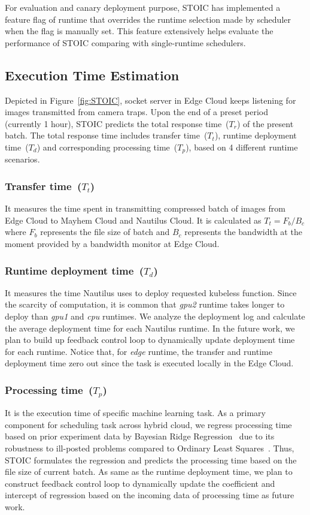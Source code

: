  For evaluation and canary deployment purpose, STOIC has implemented a feature flag of runtime that overrides the runtime selection made by scheduler when the flag is manually set. This feature extensively helps evaluate the performance of STOIC comparing with single-runtime schedulers.
 
 
 \subsection{Execution Time Estimation}
 Depicted in Figure~\ref{fig:STOIC}, socket server in Edge Cloud keeps listening for images transmitted from camera traps. Upon the end of a preset period (currently 1 hour), STOIC predicts the total response time~($T_r$) of the present batch. The total response time includes transfer time~($T_t$), runtime deployment time~($T_d$) and corresponding processing time~($T_p$), based on 4 different runtime scenarios. 
 
 \subsubsection{Transfer time~($T_t$)} It measures the time spent in transmitting compressed batch of images from Edge Cloud to Mayhem Cloud and Nautilus Cloud. It is calculated as ${T_t = F_b / B_c}$ where $F_b$ represents the file size of batch and $B_c$ represents the bandwidth at the moment provided by a bandwidth monitor at Edge Cloud. 
 
 \subsubsection{Runtime deployment time~($T_d$)} It measures the time Nautilus uses to deploy requested kubeless function. Since the scarcity of computation, it is common that \textit{gpu2} runtime takes longer to deploy than \textit{gpu1} and \textit{cpu} runtimes. We analyze the deployment log and calculate the average deployment time for each Nautilus runtime. In the future work, we plan to build up feedback control loop to dynamically update deployment time for each runtime. Notice that, for \textit{edge} runtime, the transfer and runtime deployment time zero out since the task is executed locally in the Edge Cloud.
 
 \subsubsection{Processing time~($T_p$)} It is the execution time of specific machine learning task. As a primary component for scheduling task across hybrid cloud, we regress processing time based on prior experiment data by Bayesian Ridge Regression~\cite{ref:brr} due to its robustness to ill-posted problems compared to Ordinary Least Squares~\cite{ref:ols}. Thus, STOIC formulates the regression and predicts the processing time based on the file size of current batch. As same as the runtime deployment time, we plan to construct feedback control loop to dynamically update the coefficient and intercept of regression based on the incoming data of processing time as future work.
 
